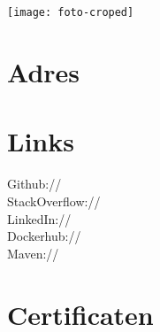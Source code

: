 \documentclass[]{deedy-resume-openfont}
\begin{document}
%
%



%
%

\begin{minipage}[t]{0.25\textwidth} 	
	
\section*{}
\vspace{-0.3in}
\texttt{[image: foto-croped]}
		

\section{Adres}
\sectionsep
	

\section{Links} 
Github:// \href{https://github.com/eernie}{} \\
StackOverflow:// \href{http://stackoverflow.com/users/1956445/eernie}{}\\
LinkedIn://  \href{https://www.linkedin.com/in/erwinoldenkamp}{}\\
Dockerhub:// \href{https://hub.docker.com/u/eernie}{}\\
Maven:// \href{https://search.maven.org/#search\%7Cga\%7C1\%7Cnl.eernie}{}
\sectionsep


\section{Certificaten}
\sectionsep


\end{minipage}
\end{document}
